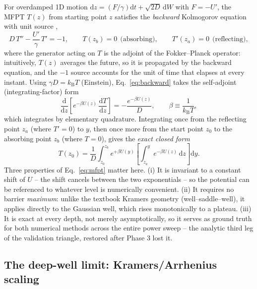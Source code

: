 \documentclass[11pt]{article}
\newcommand{\dd}{\mathrm{d}}
\newcommand{\kB}{k_{\mathrm{B}}}
\begin{document}
For overdamped 1D motion $\dd z = (F/\gamma)\dd t + \sqrt{2D}\,\dd W$ with $F = -U'$, the MFPT $T(z)$ from starting point $z$ satisfies the \emph{backward} Kolmogorov equation with unit source \cite{Gardiner2009,Hanggi1990},
\begin{equation}
D\,T'' - \frac{U'}{\gamma}\,T' = -1,
\qquad T(z_b) = 0 \ \ \text{(absorbing)}, \qquad T'(z_a) = 0 \ \ \text{(reflecting)},
\label{eq:backward}
\end{equation}
where the generator acting on $T$ is the adjoint of the Fokker--Planck operator: intuitively, $T(z)$ averages the future, so it is propagated by the backward equation, and the $-1$ source accounts for the unit of time that elapses at every instant. Using $\gamma D = \kB T$ (Einstein), Eq.~\eqref{eq:backward} takes the self-adjoint (integrating-factor) form
\begin{equation}
\frac{\dd}{\dd z}\!\left[e^{-\beta U(z)}\,\frac{\dd T}{\dd z}\right] = -\frac{e^{-\beta U(z)}}{D},
\qquad \beta \equiv \frac{1}{\kB T},
\label{eq:self-adjoint}
\end{equation}
which integrates by elementary quadrature. Integrating once from the reflecting point $z_a$ (where $T'=0$) to $y$, then once more from the start point $z_0$ to the absorbing point $z_b$ (where $T=0$), gives the \emph{exact closed form}
\begin{equation}
\boxed{\;
T(z_0) = \frac{1}{D}\int_{z_0}^{z_b} e^{+\beta U(y)}
\left[\int_{z_a}^{y} e^{-\beta U(z)}\,\dd z\right] \dd y.
\;}
\label{eq:mfpt}
\end{equation}
Three properties of Eq.~\eqref{eq:mfpt} matter here. (i) It is invariant to a constant shift of $U$ -- the shift cancels between the two exponentials -- so the potential can be referenced to whatever level is numerically convenient. (ii) It requires no barrier \emph{maximum}: unlike the textbook Kramers geometry (well--saddle--well), it applies directly to the Gaussian well, which rises monotonically to a plateau. (iii) It is exact at every depth, not merely asymptotically, so it serves as ground truth for both numerical methods across the entire power sweep -- the analytic third leg of the validation triangle, restored after Phase 3 lost it.

\subsection{The deep-well limit: Kramers/Arrhenius scaling}
\label{sec:kramers}
\end{document}
